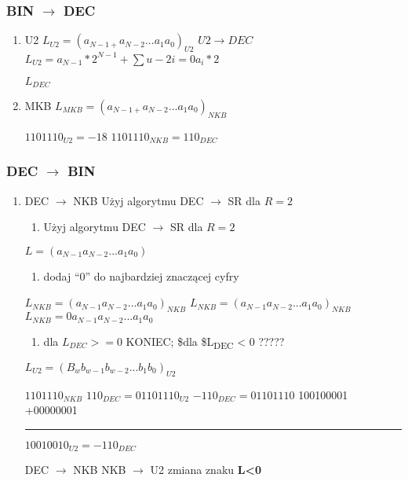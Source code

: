 \documentclass[11pt]{article}
\begin{document}
\subsubsection{BIN \(\to\) DEC}
\label{sec:org6e901c9}
\begin{enumerate}
\item U2
\label{sec:org6ad5132}
\(L_{U2}= (a_{N-1+} a_{N-2} ... a_1 a_0)_{U2}\)
\(U2 \to DEC\)
\(L_{U2}= a_{N-1}*2^{N-1} + \sum{u-2}{i=0}a_i*2\)

\(L_{DEC}\)
\item MKB
\label{sec:orgde9c992}
\(L_{MKB}= (a_{N-1+} a_{N-2} ... a_1 a_0)_{NKB}\)

\(1101110_{U2} = -18\)
\(1101110_{NKB} = 110_{DEC}\)
\end{enumerate}
\subsubsection{DEC \(\to\) BIN}
\label{sec:org44b83fa}
\begin{enumerate}
\item DEC \(\to\) NKB
\label{sec:orgedfb46c}
Użyj algorytmu DEC \(\to\) SR dla \(R=2\)
\begin{enumerate}
\item Użyj algorytmu DEC \(\to\) SR dla \(R=2\)
\end{enumerate}
\(L=(a_{N-1} a_{N-2} ... a_1 a_0)\)
\begin{enumerate}
\item dodaj ``0'' do najbardziej znaczącej cyfry
\end{enumerate}
\(L_{NKB}=(a_{N-1} a_{N-2} ... a_1 a_0)_{NKB}\)
\(L_{NKB}=(a_{N-1} a_{N-2} ... a_1 a_0)_{NKB}\)
\(L_{NKB}= 0 a_{N-1} a_{N-2} ... a_1 a_0\)
\begin{enumerate}
\item dla \(L_{DEC} >= 0\) KONIEC; \$dla \$L\textsubscript{DEC} < 0  ?????
\end{enumerate}
\(L_{U2}=(B_w b_{w-1} b_{w-2} ... b_1 b_0)_{U2}\)

\(1101110_{NKB}\)
\(110_{DEC} = 01101110_{U2}\)
\(-110_{DEC}=01101110\)
100100001
+00000001

\noindent\rule{\textwidth}{0.5pt}
\(10010010_{U2} = -110_{DEC}\)

DEC \(\to\) NKB
NKB \(\to\) U2
zmiana znaku \textbf{L<0}
\end{enumerate}
\end{document}
